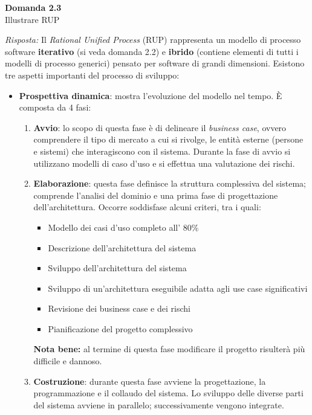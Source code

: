 \documentclass{article}
\newenvironment{problem}[2][Domanda]
    { \begin{mdframed}[backgroundcolor=gray!20] \textbf{#1 #2} \\}
    {  \end{mdframed}}
\newenvironment{solution}
    {\textit{Risposta:}}
    {}
\begin{document}
\begin{problem}{2.3}
Illustrare RUP
\end{problem}
\begin{solution}
Il \textit{Rational Unified Process} (RUP) rappresenta un modello di processo software \textbf{iterativo} (si veda domanda 2.2) e \textbf{ibrido} (contiene elementi di tutti i modelli di processo generici) pensato per software di grandi dimensioni.
\newline
Esistono tre aspetti importanti del processo di sviluppo:
\begin{itemize}
	\item \textbf{Prospettiva dinamica}: mostra l'evoluzione del modello nel tempo. È composta da 4 fasi:
	\begin{enumerate}
		\item \textbf{Avvio}: lo scopo di questa fase è di delineare il \textit{business case}, ovvero comprendere il tipo di mercato a cui si rivolge, le entità esterne (persone e sistemi) che interagiscono con il sistema.
		\newline
		Durante la fase di avvio si utilizzano modelli di caso d'uso e si effettua una valutazione dei rischi.
		\item \textbf{Elaborazione}: questa fase definisce la struttura complessiva del sistema; comprende l'analisi del dominio e una prima fase di progettazione dell'architettura.
		\newline
		Occorre soddisfase alcuni criteri, tra i quali:
		\begin{itemize}
			\item Modello dei casi d'uso completo all' 80\%
			\item Descrizione dell'architettura del sistema
			\item Sviluppo dell'architettura del sistema
			\item Sviluppo di un'architettura eseguibile adatta agli use case significativi
			\item Revisione dei business case e dei rischi
			\item Pianificazione del progetto complessivo
		\end{itemize}
		\textbf{Nota bene:} al termine di questa fase modificare il progetto risulterà più difficile e dannoso.
		\item \textbf{Costruzione}: durante questa fase avviene la progettazione, la programmazione e il collaudo del sistema.
		Lo sviluppo delle diverse parti del sistema avviene in parallelo; successivamente vengono integrate.
		\newline

\end{enumerate}
\end{itemize}
\end{solution}
\end{document}
